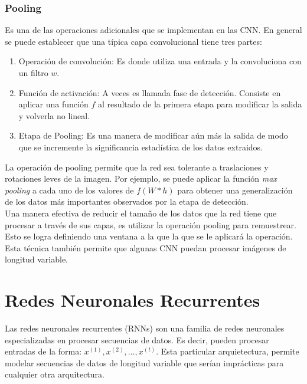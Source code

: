     \subsubsection{Pooling}
    Es una de las operaciones adicionales que se implementan en las CNN. En general se puede establecer que una típica capa convolucional tiene tres partes:
    
    \begin{enumerate}
    	\item Operación de convolución: Es donde utiliza una entrada y la convoluciona con un filtro $w$.
    	\item Función de activación: A veces es llamada fase de detección. Consiste en aplicar una función $f$ al resultado de la primera etapa para modificar la salida y volverla no lineal.
    	\item Etapa de Pooling: Es una manera de modificar aún más la salida de modo que se incremente la significancia estadística de los datos extraidos.
    \end{enumerate}

	La operación de pooling permite que la red sea tolerante a traslaciones y rotaciones leves de la imagen. Por ejemplo, se puede aplicar la función \textit{max pooling} a cada uno de los valores de $f(W*h)$ para obtener una generalización de los datos más importantes observados por la etapa de detección. \\
	
	Una manera efectiva de reducir el tamaño de los datos que la red tiene que procesar a través de sus capas, es utilizar la operación pooling para remuestrear. Esto se logra definiendo una ventana a la que la que se le aplicará la operación. Esta técnica también permite que algunas CNN puedan procesar imágenes de longitud variable.
    
    \newpage
    
   	
\section{Redes Neuronales Recurrentes}

Las redes neuronales recurrentes (RNNs) son una familia de redes neuronales especializadas en procesar secuencias de datos. Es decir, pueden procesar entradas de la forma: $x^{(1)}, x^{(2)}, \dots, x^{(t)}$. Esta particular arquietectura, permite modelar secuencias de datos de longitud variable que serían imprácticas para cualquier otra arquitectura. \\

